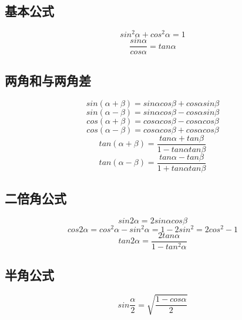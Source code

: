 
\begin{issues}
\issueDraft
\end{issues}

\subsection{基本公式}
\begin{equation}
sin^2\alpha + cos^2\alpha = 1
\end{equation}
\begin{equation}
\frac{sin\alpha}{cos\alpha} = tan\alpha
\end{equation}

\subsection{两角和与两角差}
\begin{equation}
sin(\alpha + \beta) = sin\alpha cos\beta + cos\alpha sin\beta
\end{equation}
\begin{equation}
sin(\alpha - \beta) = sin\alpha cos\beta - cos\alpha sin\beta
\end{equation}
\begin{equation}
cos(\alpha + \beta) = cos\alpha cos\beta - cos\alpha cos\beta
\end{equation}
\begin{equation}
cos(\alpha - \beta) = cos\alpha cos\beta + cos\alpha cos\beta
\end{equation}
\begin{equation}
tan(\alpha + \beta) = \frac{tan\alpha+tan\beta}{1-tan\alpha tan\beta}
\end{equation}
\begin{equation}
tan(\alpha - \beta) = \frac{tan\alpha - tan\beta}{1+tan\alpha tan\beta}
\end{equation}

\subsection{二倍角公式}
\begin{equation}
sin2\alpha = 2sin\alpha cos\beta
\end{equation}
\begin{equation}
cos2\alpha = cos^2\alpha - sin^2\alpha = 1 - 2sin^2 = 2cos^2 -1
\end{equation}
\begin{equation}
tan2\alpha = \frac{2tan\alpha}{1-tan^2\alpha}
\end{equation}

\subsection{半角公式}
\begin{equation}
sin\frac{\alpha}{2} = \sqrt{\frac{1-cos\alpha}{2}}
\end{equation}